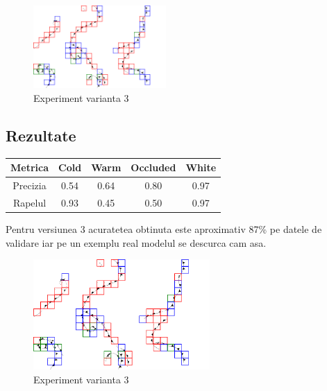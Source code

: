 \documentclass{article}
\begin{document}
 \begin{figure}[!htb]
  \centering
  \includegraphics[width=0.45\textwidth]{model_v3_output.png}
  \caption{Experiment varianta 3}
\end{figure}

\subsection{Rezultate}

\bigskip
\centering
\begin{tabular}{c || c c c c} \toprule
    {Metrica} & {Cold} & {Warm} & {Occluded} & {White} \\ \midrule
    {Precizia} & 0.54 & 0.64 & 0.80 & 0.97 \\
    {Rapelul} & 0.93 & 0.45 & 0.50 & 0.97 \\
\end{tabular}

\bigskip
Pentru versiunea 3 acuratetea obtinuta este aproximativ 87\% pe datele de validare iar pe un exemplu real modelul se descurca cam asa.
\bigskip

 \begin{figure}[!htb]
  \centering
  \includegraphics[width=0.6\textwidth]{model_v3_output.png}
  \caption{Experiment varianta 3}
\end{figure}
\end{document}
